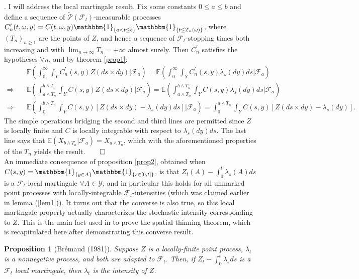 \documentclass[12pt, oneside]{report}
\newcommand{\E}{\mathbb{E}}
\newcommand{\1}[1]{\mathbbm{1}_{\{#1\}}}
\newcommand{\mc}[1]{\mathcal{#1}}
\newtheorem{proposition}[theorem]{Proposition}
\theoremstyle{definition}
\begin{document}
. I will address the local martingale result. Fix some constants $0\leq a\leq b$ and define a sequence
of $\widetilde{\mc{P}}(\mc{F}_t)$-measurable processes
$C^\prime_n(t,\omega,y)=C(t,\omega,y)\1{a<t\leq b}\1{t\leq T_n(\omega)}$, where
$(T_n)_{n\geq 1}$ are the points of $Z$, and hence a sequence of
$\mc{F}_t$-stopping times both increasing and with
$\lim_{n\rightarrow\infty}T_n=+\infty$ almost surely. Then $C^\prime_n$
satisfies the hypotheses $\forall n$, and by theorem \ref{prop1}:
\begin{align*}
    &\E\left(\int_0^\infty\int_YC_n^\prime(s,y)Z(ds\times dy)\bigg|\mc{F}_a\right)=\E\left(\int_0^\infty\int_YC_n^\prime(s,y)\lambda_s(dy)ds\bigg|\mc{F}_a\right)\\
    \Rightarrow\quad&\E\left(\int_{a\wedge T_n}^{b\wedge T_n}\int_YC(s,y)Z(ds\times dy)\bigg|\mc{F}_a\right)=\E\left(\int_{a\wedge T_n}^{b\wedge T_n}\int_Y C(s,y)\lambda_s(dy)ds\bigg|\mc{F}_a\right)\\
    \Rightarrow\quad&\E\left(\int_0^{b\wedge T_n}\int_Y C(s,y)\left[Z(ds\times dy)-\lambda_s(dy)ds\right]\bigg|\mc{F}_a\right)=\int_0^{a\wedge T_n}\int_Y C(s,y)\left[Z(ds\times dy)-\lambda_s(dy)\right].
\end{align*}
The simple operations bridging the second and third lines are permitted since
$Z$ is locally finite and $C$ is locally integrable with respect to
$\lambda_s(dy)ds$. The last line says that $\E(X_{b\wedge
T_n}|\mc{F}_a)=X_{a\wedge T_n}$, which with the aforementioned properties of the
$T_n$ yields the result.\hfill{$\qed$}\\[5pt]
\indent An immediate consequence of proposition \ref{prop2}, obtained when
$C(s,y)=\1{y\in A}\1{s\in[0,t]}$, is that $Z_t(A)-\int_0^t\lambda_s(A)ds$ is a
$\mc{F}_t$-local martingale $\forall A\in\mc{Y}$, and in particular this holds
for all unmarked point processes with locally-integrable $\mc{F}_t$-intensities
(which was claimed earlier in lemma (\ref{lem1})). It turns out that the
converse is also true, so this local martingale property actually characterizes
the stochastic intensity corresponding to $Z$. This is the main fact used in
\cite{Chevallier_Caceres_Doumic_Reynaud_Bouret_2015} to prove the spatial thinning theorem, which is recapitulated here
after demonstrating this converse result.
\begin{proposition}[Br\'emaud (1981)]\label{prop3} Suppose $Z$ is a
   locally-finite point process, $\lambda_t$ is a nonnegative process, and both
   are adapted to $\mc{F}_t$. Then, if $Z_t-\int_0^t\lambda_sds$ is a $\mc{F}_t$
   local martingale, then $\lambda_t$ is the intensity of $Z$.
\end{proposition}
\end{document}
